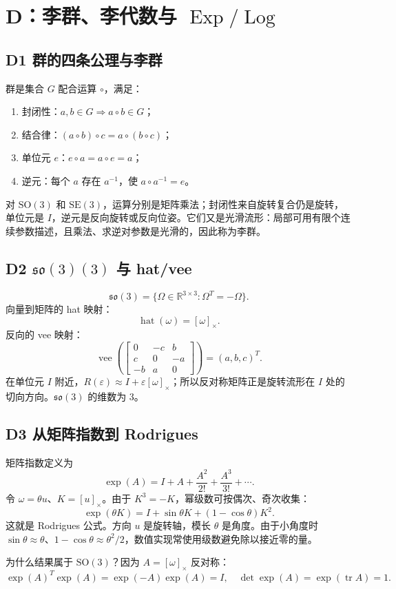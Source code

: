 \documentclass[UTF8,a4paper,11pt]{ctexart}
\newcommand{\R}{\mathbb{R}}
\newcommand{\SO}{\mathrm{SO}(3)}
\newcommand{\SE}{\mathrm{SE}(3)}
\newcommand{\so}{\mathfrak{so}(3)}
\newcommand{\Exp}{\operatorname{Exp}}
\newcommand{\Log}{\operatorname{Log}}
\newcommand{\hatmat}[1]{\left[#1\right]_{\times}}
\newcommand{\veeop}{\operatorname{vee}}
\newcommand{\hatop}{\operatorname{hat}}
\begin{document}
\section{D：李群、李代数与 \texorpdfstring{$\Exp/\Log$}{Exp/Log}}
\subsection{D1 群的四条公理与李群}
群是集合 $G$ 配合运算 $\circ$，满足：
\begin{enumerate}
\item 封闭性：$a,b\in G\Rightarrow a\circ b\in G$；
\item 结合律：$(a\circ b)\circ c=a\circ(b\circ c)$；
\item 单位元 $e$：$e\circ a=a\circ e=a$；
\item 逆元：每个 $a$ 存在 $a^{-1}$，使 $a\circ a^{-1}=e$。
\end{enumerate}
对 $\SO$ 和 $\SE$，运算分别是矩阵乘法；封闭性来自旋转复合仍是旋转，单位元是 $I$，逆元是反向旋转或反向位姿。它们又是光滑流形：局部可用有限个连续参数描述，且乘法、求逆对参数是光滑的，因此称为李群。

\subsection{D2 \texorpdfstring{$\so(3)$}{so(3)} 与 hat/vee}
\[
\so=\{\Omega\in\R^{3\times3}:\Omega^T=-\Omega\}.
\]
向量到矩阵的 hat 映射：
\[
\hatop(\omega)=\hatmat{\omega}.
\]
反向的 vee 映射：
\[
\veeop\!\left(\begin{bmatrix}0&-c&b\\c&0&-a\\-b&a&0\end{bmatrix}\right)=(a,b,c)^T.
\]
在单位元 $I$ 附近，$R(\varepsilon)\approx I+\varepsilon\hatmat{\omega}$；所以反对称矩阵正是旋转流形在 $I$ 处的切向方向。$\so$ 的维数为 3。

\subsection{D3 从矩阵指数到 Rodrigues}
矩阵指数定义为
\[
\exp(A)=I+A+\frac{A^2}{2!}+\frac{A^3}{3!}+\cdots.
\]
令 $\omega=\theta u$、$K=\hatmat{u}$。由于 $K^3=-K$，幂级数可按偶次、奇次收集：
\[
\exp(\theta K)=I+\sin\theta K+(1-\cos\theta)K^2.
\]
这就是 Rodrigues 公式。方向 $u$ 是旋转轴，模长 $\theta$ 是角度。由于小角度时 $\sin\theta\approx\theta$、$1-\cos\theta\approx\theta^2/2$，数值实现常使用级数避免除以接近零的量。

为什么结果属于 $\SO$？因为 $A=\hatmat{\omega}$ 反对称：
\[
\exp(A)^T\exp(A)=\exp(-A)\exp(A)=I,
\quad \det\exp(A)=\exp(\operatorname{tr}A)=1.
\]
\end{document}
